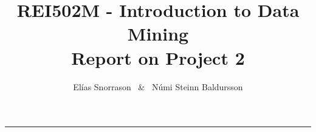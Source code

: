 \documentclass[10pt]{article}
\title{\Huge REI502M - Introduction to Data Mining\\  \Large Report on Project 2}
\author{Elías Snorrason \ \& \  Númi Steinn Baldursson}
\makeatletter
\renewcommand{\maketitle} %
{ \begingroup \vskip 10pt \begin{center} \large {\bf \@title}
	\vskip 10pt \large \@author \hskip 20pt \@date \end{center}
  \vskip 10pt \endgroup \setcounter{footnote}{0} }
\renewcommand{\=}[1]{\stackrel{#1}{=}} %
\theoremstyle{definition}
\theoremstyle{remark}
\makeatother
\begin{document}
\makeatletter
\renewcommand\subsubsection{\@startsection{subsubsection}{3}{\z@}%
{-3.25ex\@plus -1ex \@minus -.2ex}%
{1.5ex \@plus .2ex}%
{\small{$\smallbosonloopV \quad $} \quad \normalfont\large\bfseries\emph}}%

\renewcommand\subsection{\@startsection{subsection}{2}{\z@}%
{-3.25ex\@plus -1ex \@minus -.2ex}%
{2.5ex \@plus .2ex}%
{\normalfont\large\bfseries}}%
\makeatother

\quad
\vspace{3cm}
\maketitle
\setcounter{page}{1}
\thispagestyle{fancy}

\hrule
\tableofcontents
\newpage


\vspace{3cm}






%
%
%
%
%
%
\newpage
\end{document}
